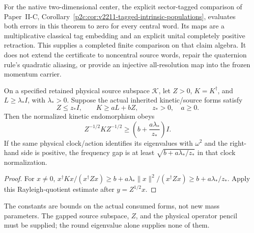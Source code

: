 \documentclass[12pt,a4paper]{article}
\begin{document}
For the native two-dimensional center, the explicit sector-tagged comparison
of Paper~II-C,
Corollary~\ref{p2c:cor:v2211-tagged-intrinsic-populations}, evaluates both
errors in this theorem to zero for every central word.  Its maps are a
multiplicative classical tag embedding and an explicit unital completely
positive retraction.  This supplies a completed finite comparison on that
claim algebra.  It does not extend the certificate to noncentral source
words, repair the quaternion rule's quadratic aliasing, or provide an
injective all-resolution map into the frozen momentum carrier.

\begin{proposition}
\label{p2d:prop:v2210-lit-kinetic-gap}
On a specified retained physical source subspace $\mathcal K$, let
$Z>0$, $K=K^\dagger$, and $L\ge\lambda_*I$, with $\lambda_*>0$.
Suppose the actual inherited kinetic/source forms satisfy
\[
 Z\le z_*I,\qquad K\ge aL+bZ,
 \qquad z_*>0,\quad a\ge0.
\]
Then the normalized kinetic endomorphism obeys
\[
 Z^{-1/2}KZ^{-1/2}\ge
 \left(b+\frac{a\lambda_*}{z_*}\right)I.
\]
If the same physical clock/action identifies its eigenvalues with
$\omega^2$ and the right-hand side is positive, the frequency gap is at
least $\sqrt{b+a\lambda_*/z_*}$ in that clock normalization.
\end{proposition}
\begin{proof}
For $x\ne0$,
$x^\dagger Kx/(x^\dagger Zx)\ge
b+a\lambda_*\|x\|^2/(x^\dagger Zx)\ge b+a\lambda_*/z_*$.
Apply this Rayleigh-quotient estimate after $y=Z^{1/2}x$.
\end{proof}
The constants are bounds on the actual consumed forms, not new mass
parameters.  The gapped source subspace, $Z$, and the physical operator
pencil must be supplied; the round eigenvalue alone supplies none of them.
\end{document}

